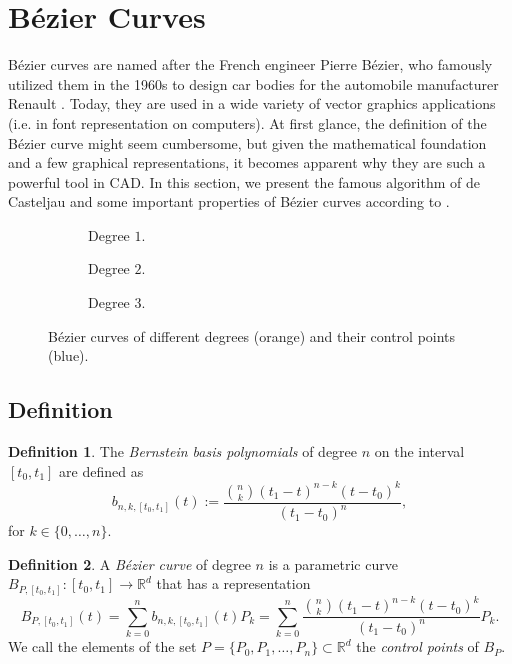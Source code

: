 \documentclass[a4paper, 11pt]{report}
\theoremstyle{definition}
\newtheorem{definition}{Definition}[section]
\renewcommand{\emph}[1]{\textit{#1}}
\begin{document}
\section{Bézier Curves}
	Bézier curves are named after the French engineer Pierre Bézier, who famously utilized them in the 1960s to design car bodies for the automobile manufacturer Renault \cite{Bezier1968}. Today, they are used in a wide variety of vector graphics applications (i.e. in font representation on computers). At first glance, the definition of the Bézier curve might seem cumbersome, but given the mathematical foundation and a few graphical representations, it becomes apparent why they are such a powerful tool in CAD. In this section, we present the famous algorithm of de Casteljau and some important properties of Bézier curves according to \cite{Farin2001}.

	\begin{figure}[H]
		\centering
		\begin{subfigure}{0.25\textwidth}
			
			\caption{Degree $1$.}
		\end{subfigure}
		\begin{subfigure}{0.25\textwidth}
			
			\caption{Degree $2$.}
		\end{subfigure}
		\begin{subfigure}{0.25\textwidth}
			
			\caption{Degree $3$.}
		\end{subfigure}
		\caption{Bézier curves of different degrees (orange) and their control points (blue).}
		\label{fig:bezierdifferentdegrees}
	\end{figure}

\subsection{Definition}
	\begin{definition}
		The \emph{Bernstein basis polynomials} of degree $n$ on the interval $[t_0,t_1]$ are defined as
		\begin{equation}\label{eq:bernsteinbasisdef}
			b_{n,k,[t_0, t_1]}(t) := \frac{\binom{n}{k} (t_1-t)^{n-k}(t-t_0)^k}{(t_1-t_0)^n},
		\end{equation}
		for $k \in \{0,\dots, n\}$.
	\end{definition}

	\begin{definition}
		A \emph{Bézier curve} of degree $n$ is a parametric curve $B_{P,[t_0, t_1]}: [t_0, t_1] \rightarrow \mathbb{R}^d$ that has a representation
		\begin{equation}\label{eq:bezierdef}
			B_{P, [t_0, t_1]}(t) = \sum_{k=0}^n b_{n,k,[t_0, t_1]}(t) P_k = \sum_{k=0}^n \frac{\binom{n}{k} (t_1-t)^{n-k}(t-t_0)^k}{(t_1-t_0)^n} P_k.
		\end{equation}
		We call the elements of the set $P = \{P_0, P_1, \dots, P_n\} \subset \mathbb{R}^d$ the \emph{control points} of $B_P$.
	\end{definition}
\end{document}
